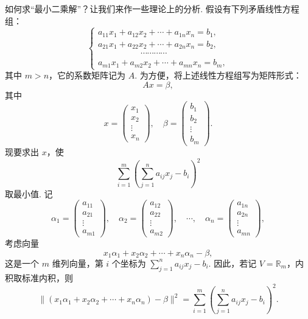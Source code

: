 \documentclass[UTF8,12pt,a4paper,fontset=fandol]{ctexart}
\begin{document}
如何求“最小二乘解”？让我们来作一些理论上的分析. 假设有下列矛盾线性方程组：
\[
  \begin{cases}
    a_{11}x_1+a_{12}x_2+\cdots+a_{1n}x_n=b_1,\\
    a_{21}x_1+a_{22}x_2+\cdots+a_{2n}x_n=b_2,\\
    \hspace{5em}\cdots\cdots\cdots\cdots\\
    a_{m1}x_1+a_{m2}x_2+\cdots+a_{mn}x_n=b_m,
  \end{cases}
\]
其中 $m>n$，它的系数矩阵记为 $A$. 为方便，将上述线性方程组写为矩阵形式：
\begin{equation}
  Ax=\beta,
  \tag{9.10.4}
\end{equation}
其中
\[
  x=
  \left(\begin{array}{c}
    x_1\\ x_2\\ \vdots\\ x_n
  \end{array}\right),\quad
  \beta=
  \left(\begin{array}{c}
    b_1\\ b_2\\ \vdots\\ b_m
  \end{array}\right).
\]
现要求出 $x$，使
\[
  \sum_{i=1}^m\left(\sum_{j=1}^na_{ij}x_j-b_i\right)^2
\]
取最小值. 记
\[
  \alpha_1=
  \left(\begin{array}{c}
    a_{11}\\ a_{21}\\ \vdots\\ a_{m1}
  \end{array}\right),\quad
  \alpha_2=
  \left(\begin{array}{c}
    a_{12}\\ a_{22}\\ \vdots\\ a_{m2}
  \end{array}\right),\quad
  \cdots,\quad
  \alpha_n=
  \left(\begin{array}{c}
    a_{1n}\\ a_{2n}\\ \vdots\\ a_{mn}
  \end{array}\right),
\]
考虑向量
\[
  x_1\alpha_1+x_2\alpha_2+\cdots+x_n\alpha_n-\beta,
\]
这是一个 $m$ 维列向量，第 $i$ 个坐标为 $\sum_{j=1}^na_{ij}x_j-b_i$. 因此，若记 $V=\mathbb R_m$，内积取标准内积，则
\[
  \|(x_1\alpha_1+x_2\alpha_2+\cdots+x_n\alpha_n)-\beta\|^2
  =\sum_{i=1}^m\left(\sum_{j=1}^na_{ij}x_j-b_i\right)^2.
\]
\end{document}
